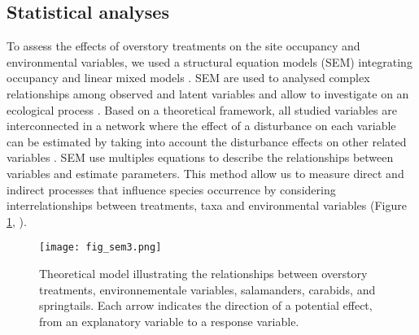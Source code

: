 \subsection*{Statistical analyses}
\label{subsec:analyses}

To assess the effects of overstory treatments on the site occupancy and environmental variables, we used a structural equation models (SEM) integrating occupancy and linear mixed models \citep{graceSpecificationStructuralEquation2010,josephIntegratingOccupancyModels2016,mackenzieOccupancyEstimationModeling2006a}.
SEM are used to analysed complex relationships among observed and latent variables and allow to investigate on an ecological process \citep{graceStructuralEquationModeling2008}.
Based on a theoretical framework, all studied variables are interconnected in a network where the effect of a disturbance on each variable can be estimated by taking into account 
the disturbance effects on other related variables \citep{graceStructuralEquationModeling2008}.
SEM use multiples equations to describe the relationships between variables and estimate parameters.
This method allow us to measure direct and indirect processes that influence species occurrence by considering interrelationships between treatments, taxa and environmental variables (Figure \ref*{fig:SEM}, \citealp{graceSpecificationStructuralEquation2010}).
\\

\begin{figure}[ht!]
	\centering
	\texttt{[image: fig\_sem3.png]}
	\caption[Theoretical model illustrating the relationships between overstory treatments, environmental variables and taxa.]{Theoretical model illustrating the relationships between overstory treatments, environnementale variables, salamanders, carabids, and springtails. 
  Each arrow indicates the direction of a potential effect, from an explanatory variable to a response variable.}
	\label{fig:SEM}
	\end{figure}  

